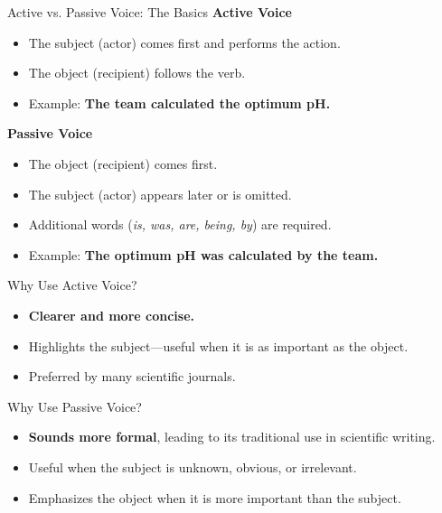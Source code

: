 \begin{frame}{Active vs. Passive Voice: The Basics}
  \textbf{Active Voice} \pause
  \begin{itemize}
    \item The subject (actor) comes first and performs the action.
    \item The object (recipient) follows the verb.
    \item Example: \textbf{The team calculated the optimum pH.}
  \end{itemize}
  \textbf{Passive Voice} \pause
  \begin{itemize}
    \item The object (recipient) comes first.
    \item The subject (actor) appears later or is omitted.
    \item Additional words (\textit{is, was, are, being, by}) are required.
    \item Example: \textbf{The optimum pH was calculated by the team.}
  \end{itemize}
\end{frame}

\begin{frame}{Why Use Active Voice?}
  \begin{itemize}
    \item \textbf{Clearer and more concise.} \pause
    \item Highlights the subject—useful when it is as important as the object. \pause
    \item Preferred by many scientific journals.
  \end{itemize}
\end{frame}

\begin{frame}{Why Use Passive Voice?}
  \begin{itemize}
    \item \textbf{Sounds more formal}, leading to its traditional use in scientific writing. \pause
    \item Useful when the subject is unknown, obvious, or irrelevant.
    \item Emphasizes the object when it is more important than the subject.
  \end{itemize}
\end{frame}

